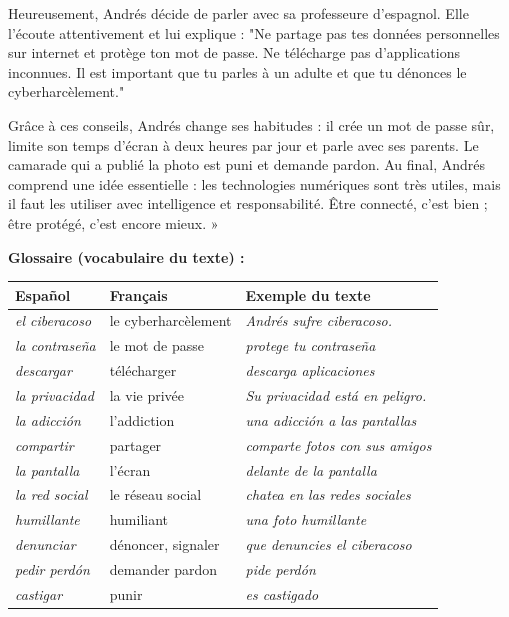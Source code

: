 \documentclass[11pt]{article}
\newcommand{\esp}[1]{\ifmmode\text{\textit{#1}}\else\begingroup\selectlanguage{spanish}\itshape #1\endgroup\fi}
\begin{document}
Heureusement, Andrés décide de parler avec sa professeure d'espagnol. Elle l'écoute attentivement et lui explique : "Ne partage pas tes données personnelles sur internet et protège ton mot de passe. Ne télécharge pas d'applications inconnues. Il est important que tu parles à un adulte et que tu dénonces le cyberharcèlement."

Grâce à ces conseils, Andrés change ses habitudes : il crée un mot de passe sûr, limite son temps d'écran à deux heures par jour et parle avec ses parents. Le camarade qui a publié la photo est puni et demande pardon. Au final, Andrés comprend une idée essentielle : les technologies numériques sont très utiles, mais il faut les utiliser avec intelligence et responsabilité. Être connecté, c'est bien ; être protégé, c'est encore mieux. »

\textbf{Glossaire (vocabulaire du texte) :}

\begin{center}
\begin{tabularx}{\linewidth}{|X|X|X|}
\hline
\rowcolor{popblueL} \textbf{Español} & \textbf{Français} & \textbf{Exemple du texte} \\
\hline
\esp{el ciberacoso} & le cyberharcèlement & \esp{Andrés sufre ciberacoso.} \\
\hline
\esp{la contraseña} & le mot de passe & \esp{protege tu contraseña} \\
\hline
\esp{descargar} & télécharger & \esp{descarga aplicaciones} \\
\hline
\esp{la privacidad} & la vie privée & \esp{Su privacidad está en peligro.} \\
\hline
\esp{la adicción} & l'addiction & \esp{una adicción a las pantallas} \\
\hline
\esp{compartir} & partager & \esp{comparte fotos con sus amigos} \\
\hline
\esp{la pantalla} & l'écran & \esp{delante de la pantalla} \\
\hline
\esp{la red social} & le réseau social & \esp{chatea en las redes sociales} \\
\hline
\esp{humillante} & humiliant & \esp{una foto humillante} \\
\hline
\esp{denunciar} & dénoncer, signaler & \esp{que denuncies el ciberacoso} \\
\hline
\esp{pedir perdón} & demander pardon & \esp{pide perdón} \\
\hline
\esp{castigar} & punir & \esp{es castigado} \\
\hline
\end{tabularx}
\end{center}
\end{document}

